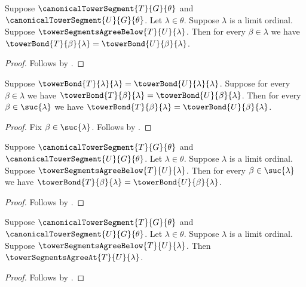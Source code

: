 \begin{proposition}\label{canonical_tower_limit_old_bonds_agree}
    Suppose $\canonicalTowerSegment{T}{G}{\theta}$ and
        $\canonicalTowerSegment{U}{G}{\theta}$.
    Let $\lambda\in\theta$.
    Suppose $\lambda$ is a limit ordinal.
    Suppose $\towerSegmentsAgreeBelow{T}{U}{\lambda}$.
    Then for every $\beta\in\lambda$ we have
        $\towerBond{T}{\beta}{\lambda}=
            \towerBond{U}{\beta}{\lambda}$.
\end{proposition}
\begin{proof}
    Follows by .
\end{proof}

\begin{proposition}\label{tower_bonds_agree_on_successor_from_cases}
    Suppose $\towerBond{T}{\lambda}{\lambda}=
        \towerBond{U}{\lambda}{\lambda}$.
    Suppose for every $\beta\in\lambda$ we have
        $\towerBond{T}{\beta}{\lambda}=
            \towerBond{U}{\beta}{\lambda}$.
    Then for every $\beta\in\suc{\lambda}$ we have
        $\towerBond{T}{\beta}{\lambda}=
            \towerBond{U}{\beta}{\lambda}$.
\end{proposition}
\begin{proof}
    Fix $\beta\in\suc{\lambda}$.
    Follows by .
\end{proof}

\begin{proposition}\label{canonical_tower_limit_bond_agreement}
    Suppose $\canonicalTowerSegment{T}{G}{\theta}$ and
        $\canonicalTowerSegment{U}{G}{\theta}$.
    Let $\lambda\in\theta$.
    Suppose $\lambda$ is a limit ordinal.
    Suppose $\towerSegmentsAgreeBelow{T}{U}{\lambda}$.
    Then for every $\beta\in\suc{\lambda}$ we have
        $\towerBond{T}{\beta}{\lambda}=
            \towerBond{U}{\beta}{\lambda}$.
\end{proposition}
\begin{proof}
    Follows by
        .
\end{proof}

\begin{proposition}\label{canonical_tower_segments_agree_at_limit}
    Suppose $\canonicalTowerSegment{T}{G}{\theta}$ and
        $\canonicalTowerSegment{U}{G}{\theta}$.
    Let $\lambda\in\theta$.
    Suppose $\lambda$ is a limit ordinal.
    Suppose $\towerSegmentsAgreeBelow{T}{U}{\lambda}$.
    Then $\towerSegmentsAgreeAt{T}{U}{\lambda}$.
\end{proposition}
\begin{proof}
    Follows by
        .
\end{proof}

